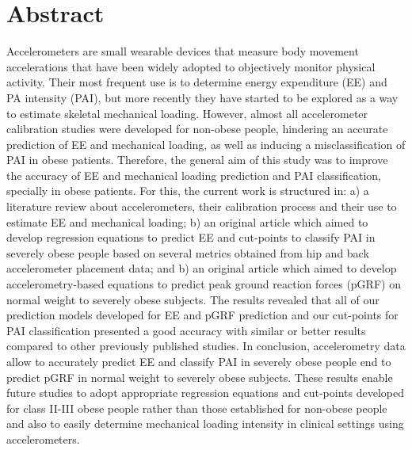 \documentclass[12pt]{article}
\begin{document}
\section*{Abstract}
\vspace{1em}

Accelerometers are small wearable devices that measure body movement accelerations that have been widely adopted to objectively monitor physical activity. Their most frequent use is to determine energy expenditure (EE) and PA intensity (PAI), but more recently they have started to be explored as a way to estimate skeletal mechanical loading. However, almost all accelerometer calibration studies were developed for non-obese people, hindering an accurate prediction of EE and mechanical loading, as well as inducing a misclassification of PAI in obese patients. Therefore, the general aim of this study was to improve the accuracy of EE and mechanical loading prediction and PAI classification, specially in obese patients. For this, the current work is structured in: a) a literature review about accelerometers, their calibration process and their use to estimate EE and mechanical loading; b) an original article which aimed to develop regression equations to predict EE and cut-points to classify PAI in severely obese people based on several metrics obtained from hip and back accelerometer placement data; and b) an original article which aimed to develop accelerometry-based equations to predict peak ground reaction forces (pGRF) on normal weight to severely obese subjects. The results revealed that all of our prediction models developed for EE and pGRF prediction and our cut-points for PAI classification presented a good accuracy with similar or better results compared to other previously published studies. In conclusion, accelerometry data allow to accurately predict EE and classify PAI in severely obese people end to predict pGRF in normal weight to severely obese subjects. These results enable future studies to adopt appropriate regression equations and cut-points developed for class II-III obese people rather than those established for non-obese people and also to easily determine mechanical loading intensity in clinical settings using accelerometers.
\end{document}
